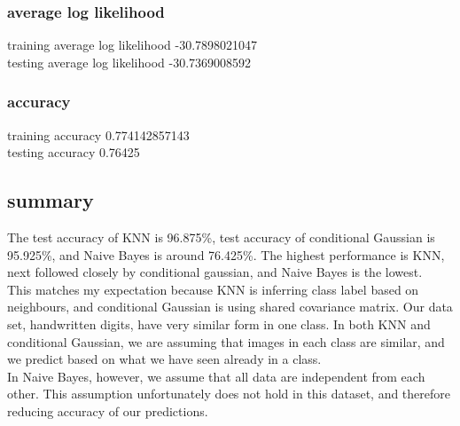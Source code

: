\documentclass[letterpaper, 12]{article}
\begin{document}
\subsubsection{average log likelihood}
training average log likelihood -30.7898021047\\
testing average log likelihood -30.7369008592
\subsubsection{accuracy}
training accuracy 0.774142857143\\
testing accuracy 0.76425\\

\subsection{summary}
The test accuracy of KNN is 96.875\%, test accuracy of conditional Gaussian is 95.925\%, and Naive Bayes is around 76.425\%. The highest performance is KNN, next followed closely by conditional gaussian, and Naive Bayes is the lowest.\\
This matches my expectation because KNN is inferring class label based on neighbours, and conditional Gaussian is using shared covariance matrix. Our data set, handwritten digits, have very similar form in one class. In both KNN and conditional Gaussian, we are assuming that images in each class are similar, and we predict based on what we have seen already in a class.\\
In Naive Bayes, however, we assume that all data are independent from each other. This assumption unfortunately does not hold in this dataset, and therefore reducing accuracy of our predictions.




\end{document}
